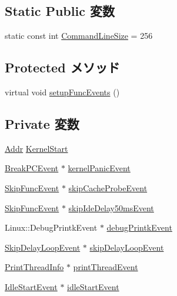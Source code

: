 \subsection*{Static Public 変数}
\begin{DoxyCompactItemize}
\item 
static const int \hyperlink{classLinuxAlphaSystem_a40cf7cde1351c066dee545df2832e4c7}{CommandLineSize} = 256
\end{DoxyCompactItemize}
\subsection*{Protected メソッド}
\begin{DoxyCompactItemize}
\item 
virtual void \hyperlink{classLinuxAlphaSystem_ae36115f702dd2f9ead5df8d632632cf7}{setupFuncEvents} ()
\end{DoxyCompactItemize}
\subsection*{Private 変数}
\begin{DoxyCompactItemize}
\item 
\hyperlink{base_2types_8hh_af1bb03d6a4ee096394a6749f0a169232}{Addr} \hyperlink{classLinuxAlphaSystem_a586fffad970b7236ceaab6d5cb3eb9d0}{KernelStart}
\item 
\hyperlink{classBreakPCEvent}{BreakPCEvent} $\ast$ \hyperlink{classLinuxAlphaSystem_aa052aa785f60b08b9c27dfe6838686e4}{kernelPanicEvent}
\item 
\hyperlink{classSkipFuncEvent}{SkipFuncEvent} $\ast$ \hyperlink{classLinuxAlphaSystem_aa2dee1f9674e5ea129c2c31d05ce6412}{skipCacheProbeEvent}
\item 
\hyperlink{classSkipFuncEvent}{SkipFuncEvent} $\ast$ \hyperlink{classLinuxAlphaSystem_accb807c7d7a32466eb9f7ddf7e07d582}{skipIdeDelay50msEvent}
\item 
Linux::DebugPrintkEvent $\ast$ \hyperlink{classLinuxAlphaSystem_aedceac66468548dd7c74a37cb968a83b}{debugPrintkEvent}
\item 
\hyperlink{structLinuxAlphaSystem_1_1SkipDelayLoopEvent}{SkipDelayLoopEvent} $\ast$ \hyperlink{classLinuxAlphaSystem_a9cab420f2dc7381c4c07941ff49c8167}{skipDelayLoopEvent}
\item 
\hyperlink{structLinuxAlphaSystem_1_1PrintThreadInfo}{PrintThreadInfo} $\ast$ \hyperlink{classLinuxAlphaSystem_ad433ad9dba393cab0cb0b67f6d3d58ab}{printThreadEvent}
\item 
\hyperlink{classIdleStartEvent}{IdleStartEvent} $\ast$ \hyperlink{classLinuxAlphaSystem_a063da82d4b5c3e8ea09eeb1d65d0666e}{idleStartEvent}
\end{DoxyCompactItemize}


